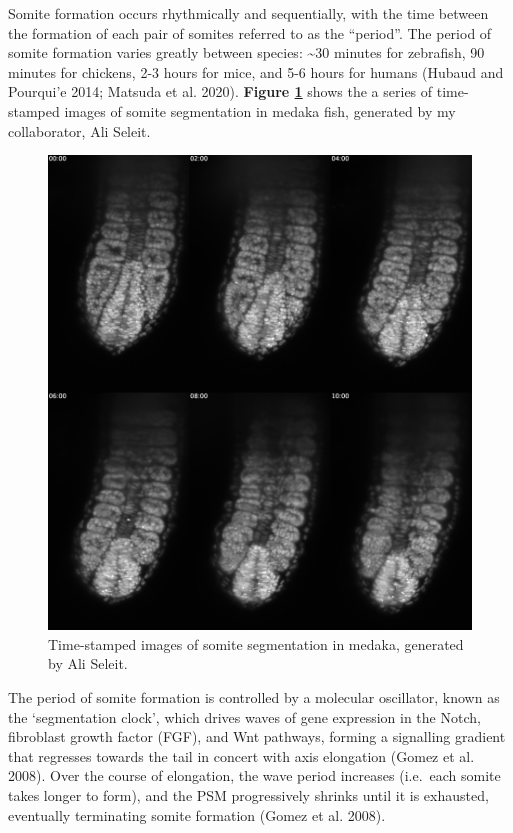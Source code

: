 \documentclass[
]{book}
\begin{document}
Somite formation occurs rhythmically and sequentially, with the time between the formation of each pair of somites referred to as the ``period''. The period of somite formation varies greatly between species: \textasciitilde30 minutes for zebrafish, 90 minutes for chickens, 2-3 hours for mice, and 5-6 hours for humans (Hubaud and Pourqui'e 2014; Matsuda et al. 2020). \textbf{Figure \ref{fig:somite-seg-ali}} shows the a series of time-stamped images of somite segmentation in medaka fish, generated by my collaborator, Ali Seleit.



\begin{figure}

\includegraphics[width=1\linewidth]{figs/somites/ali_fish_seg_compiled} \hfill{}

\caption{Time-stamped images of somite segmentation in medaka, generated by Ali Seleit.}\label{fig:somite-seg-ali}
\end{figure}

The period of somite formation is controlled by a molecular oscillator, known as the `segmentation clock', which drives waves of gene expression in the Notch, fibroblast growth factor (FGF), and Wnt pathways, forming a signalling gradient that regresses towards the tail in concert with axis elongation (Gomez et al. 2008). Over the course of elongation, the wave period increases (i.e.~each somite takes longer to form), and the PSM progressively shrinks until it is exhausted, eventually terminating somite formation (Gomez et al. 2008).
\end{document}

